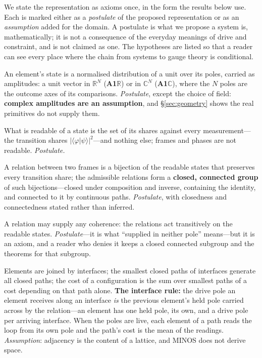 \documentclass[11pt,a4paper]{article}
\theoremstyle{plain}
\theoremstyle{definition}
\theoremstyle{remark}
\newcommand{\R}{\mathbb{R}}
\newcommand{\C}{\mathbb{C}}
\begin{document}
We state the representation as axioms once, in the form the results below use. Each is marked either as a \emph{postulate} of the proposed representation or as an \emph{assumption} added for the domain. A postulate is what we propose a system is, mathematically; it is not a consequence of the everyday meanings of drive and constraint, and is not claimed as one. The hypotheses are listed so that a reader can see every place where the chain from systems to gauge theory is conditional.

\begin{description}[leftmargin=1.5em,style=nextline]
\item[A1 --- the state.] An element's state is a normalised distribution of a unit over its poles, carried as amplitudes: a unit vector in $\R^N$ (\textbf{A1$\R$}) or in $\C^N$ (\textbf{A1$\C$}), where the $N$ poles are the outcome axes of its comparisons. \emph{Postulate}, except the choice of field: \textbf{complex amplitudes are an assumption}, and \S\ref{sec:geometry} shows the real primitives do not supply them.
\item[A2 --- the readable.] What is readable of a state is the set of its shares against every measurement---the transition shares $|\langle\varphi|\psi\rangle|^2$---and nothing else; frames and phases are not readable. \emph{Postulate.}
\item[A3 --- the relation.] A relation between two frames is a bijection of the readable states that preserves every transition share; the admissible relations form a \textbf{closed, connected group} of such bijections---closed under composition and inverse, containing the identity, and connected to it by continuous paths. \emph{Postulate}, with closedness and connectedness stated rather than inferred.
\item[A3b --- transitivity.] A relation may supply any coherence: the relations act transitively on the readable states. \emph{Postulate}---it is what ``supplied in neither pole'' means---but it is an axiom, and a reader who denies it keeps a closed connected subgroup and the theorems for that subgroup.
\item[A4 --- adjacency, the interface rule, locality.] Elements are joined by interfaces; the smallest closed paths of interfaces generate all closed paths; the cost of a configuration is the sum over smallest paths of a cost depending on that path alone. \textbf{The interface rule:} the drive pole an element receives along an interface \emph{is} the previous element's held pole carried across by the relation---an element has one held pole, its own, and a drive pole per arriving interface. When the poles are live, each element of a path reads the loop from its own pole and the path's cost is the mean of the readings. \emph{Assumption}: adjacency is the content of a lattice, and MINOS does not derive space.

\end{description}
\end{document}
